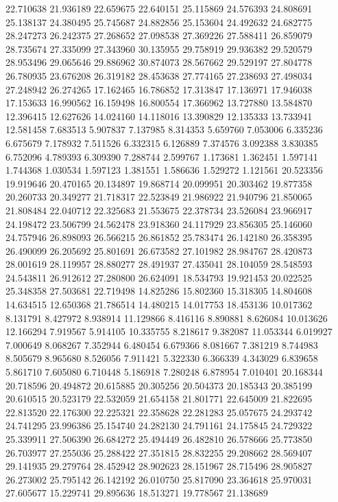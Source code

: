 22.710638
21.936189
22.659675
22.640151
25.115869
24.576393
24.808691
25.138137
24.380495
25.745687
24.882856
25.153604
24.492632
24.682775
28.247273
26.242375
27.268652
27.098538
27.369226
27.588411
26.859079
28.735674
27.335099
27.343960
30.135955
29.758919
29.936382
29.520579
28.953496
29.065646
29.886962
30.874073
28.567662
29.529197
27.804778
26.780935
23.676208
26.319182
28.453638
27.774165
27.238693
27.498034
27.248942
26.274265
17.162465
16.786852
17.313847
17.136971
17.946038
17.153633
16.990562
16.159498
16.800554
17.366962
13.727880
13.584870
12.396415
12.627626
14.024160
14.118016
13.390829
12.135333
13.733941
12.581458
7.683513
5.907837
7.137985
8.314353
5.659760
7.053006
6.335236
6.675679
7.178932
7.511526
6.332315
6.126889
7.374576
3.092388
3.830385
6.752096
4.789393
6.309390
7.288744
2.599767
1.173681
1.362451
1.597141
1.744368
1.030534
1.597123
1.381551
1.586636
1.529272
1.121561
20.523356
19.919646
20.470165
20.134897
19.868714
20.099951
20.303462
19.877358
20.260733
20.349277
21.718317
22.523849
21.986922
21.940796
21.850065
21.808484
22.040712
22.325683
21.553675
22.378734
23.526084
23.966917
24.198472
23.506799
24.562478
23.918360
24.117929
23.856305
25.146060
24.757946
26.898093
26.566215
26.861852
25.783474
26.142180
26.358395
26.490099
26.205692
25.801691
26.673582
27.101982
28.984767
28.420873
28.001619
28.119957
28.880277
28.491937
27.435041
28.104059
28.548593
24.543811
26.912612
27.280800
26.624091
18.534793
19.921453
20.022525
25.348358
27.503681
22.719498
14.825286
15.802360
15.318305
14.804608
14.634515
12.650368
21.786514
14.480215
14.017753
18.453136
10.017362
8.131791
8.427972
8.938914
11.129866
8.416116
8.890881
8.626084
10.013626
12.166294
7.919567
5.914105
10.335755
8.218617
9.382087
11.053344
6.019927
7.000649
8.068267
7.352944
6.480454
6.679366
8.081667
7.381219
8.744983
8.505679
8.965680
8.526056
7.911421
5.322330
6.366339
4.343029
6.839658
5.861710
7.605080
6.710448
5.186918
7.280248
6.878954
7.010401
20.168344
20.718596
20.494872
20.615885
20.305256
20.504373
20.185343
20.385199
20.610515
20.523179
22.532059
21.654158
21.801771
22.645009
21.822695
22.813520
22.176300
22.225321
22.358628
22.281283
25.057675
24.293742
24.741295
23.996386
25.154740
24.282130
24.791161
24.175845
24.729322
25.339911
27.506390
26.684272
25.494449
26.482810
26.578666
25.773850
26.703977
27.255036
25.288422
27.351815
28.832255
29.208662
28.569407
29.141935
29.279764
28.452942
28.902623
28.151967
28.715496
28.905827
26.273002
25.795142
26.142192
26.010750
25.817090
23.364618
25.970031
27.605677
15.229741
29.895636
18.513271
19.778567
21.138689
